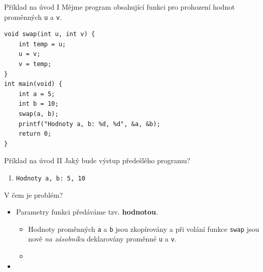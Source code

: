 \documentclass[14pt,aspectratio=169]{beamer}
\begin{document}
    \begin{frame}[t,fragile]{Příklad na úvod I}
        Mějme program obsahující funkci pro prohození hodnot proměnných \texttt{u} a \texttt{v}.
        \begin{lstlisting}
void swap(int u, int v) {
    int temp = u;
    u = v;
    v = temp;
}
int main(void) {
    int a = 5;
    int b = 10;
    swap(a, b);
    printf("Hodnoty a, b: %d, %d", &a, &b);
    return 0;
}
        \end{lstlisting}
    \end{frame}

    \begin{frame}[t]{Příklad na úvod II}
        Jaký bude výstup předešlého programu?
        \begin{enumerate}[label=(\alph*)]
            \item \texttt{Hodnoty a, b: 5, 10}
        \end{enumerate}
    \end{frame}

    \begin{frame}[t]{V čem je problém?}
        \begin{itemize}
            \item Parametry funkci předáváme tzv. \textbf{hodnotou}.
            \begin{itemize}
                \item Hodnoty proměnných \texttt{a} a \texttt{b} jsou zkopírovány a při volání funkce \texttt{swap} jsou nově \emph{na zásobníku} deklarovány proměnné \texttt{u} a \texttt{v}.
                \item {}
            \end{itemize}
            \item {}
        \end{itemize}
    \end{frame}
\end{document}
